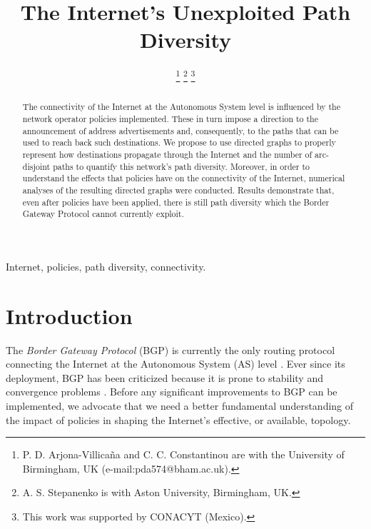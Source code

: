 \documentclass[10pt,final,journal]{IEEEtran}
\begin{document}
\title{The Internet's Unexploited Path Diversity}

\author{
	\thanks{P. D. Arjona-Villica\~{n}a and C. C. Constantinou are with the University of Birmingham, UK (e-mail:pda574@bham.ac.uk).}
	\thanks{A. S. Stepanenko is with Aston University, Birmingham, UK.}
	\thanks{This work was supported by CONACYT (Mexico).}
}
\maketitle



\begin{abstract}
The connectivity of the Internet at the Autonomous System level is influenced by the network operator policies implemented. These in turn impose a direction to the announcement of address advertisements and, consequently, to the paths that can be used to reach back such destinations. We propose to use directed graphs to properly represent how destinations propagate through the Internet and the number of arc-disjoint paths to quantify this network's path diversity. Moreover, in order to understand the effects that policies have on the connectivity of the Internet, numerical analyses of the resulting directed graphs were conducted. Results demonstrate that, even after policies have been applied, there is still path diversity which the Border Gateway Protocol cannot currently exploit.
\end{abstract}

\begin{IEEEkeywords}
Internet, policies, path diversity, connectivity.
\end{IEEEkeywords}



\section{Introduction}\label{intro}

The \emph{Border Gateway Protocol} (BGP) is currently the only routing protocol connecting the Internet at the Autonomous System (AS) level \cite{Rekhter2006}. Ever since its deployment, BGP has been criticized because it is prone to  stability and convergence problems \cite{Labovitz1997, Labovitz2000}. Before any significant improvements to BGP can be implemented, we advocate that we need a better fundamental understanding of the impact of policies in shaping the Internet's effective, or available, topology.
\end{document}
